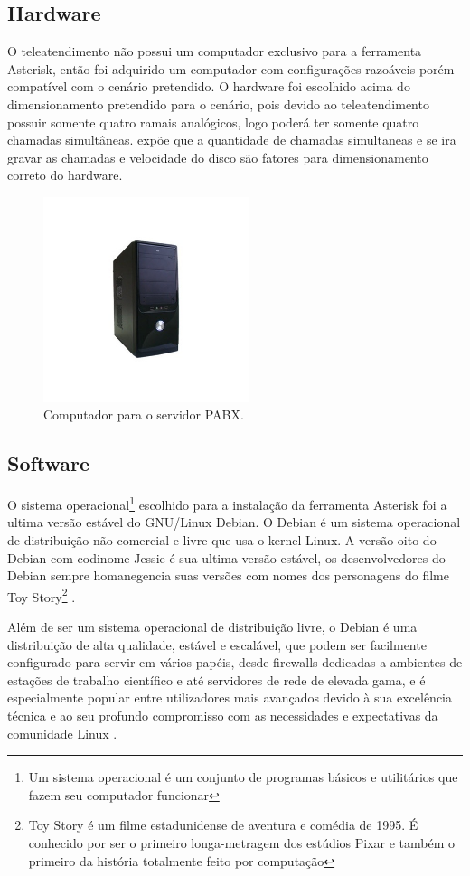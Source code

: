 \subsection{Hardware}
O teleatendimento não possui um computador exclusivo para a ferramenta Asterisk, então foi adquirido um computador com configurações razoáveis porém compatível com o cenário pretendido. O hardware foi escolhido acima do dimensionamento pretendido para o cenário, pois devido ao teleatendimento possuir somente quatro ramais analógicos, logo poderá ter somente quatro chamadas simultâneas.  expõe que a quantidade de chamadas simultaneas e se ira gravar as chamadas e velocidade do disco são fatores para dimensionamento correto do hardware. 

\begin{figure}[h]
	\centering
	\includegraphics[width=6cm]{imagens/gabinete.jpg}
	\caption{Computador para o servidor PABX.}
    \label{Figura18}
\end{figure}

\subsection{Software}
O sistema operacional\footnote{Um sistema operacional é um conjunto de programas básicos e utilitários que fazem seu computador funcionar} escolhido para a instalação da ferramenta Asterisk foi a ultima versão estável do GNU/Linux Debian. O Debian é um sistema operacional de distribuição não comercial e livre que usa o kernel Linux. A versão oito do Debian com codinome Jessie é sua ultima versão estável, os desenvolvedores do Debian sempre homanegencia suas versões com nomes dos personagens do filme Toy Story\footnote{Toy Story é um filme estadunidense de aventura e comédia de 1995. É conhecido por ser o primeiro longa-metragem dos estúdios Pixar e também o primeiro da história totalmente feito por computação} \cite{valessiosoaresbrito2015}.

Além de ser um sistema operacional de distribuição livre, o Debian é uma distribuição de alta qualidade, estável e escalável, que podem ser facilmente configurado para servir em vários papéis, desde firewalls dedicadas a ambientes de estações de trabalho científico e até servidores de rede de elevada gama, e é especialmente popular entre utilizadores mais avançados devido à sua excelência técnica e ao seu profundo compromisso com as necessidades e expectativas da comunidade Linux \cite{valessiosoaresbrito2015}.


